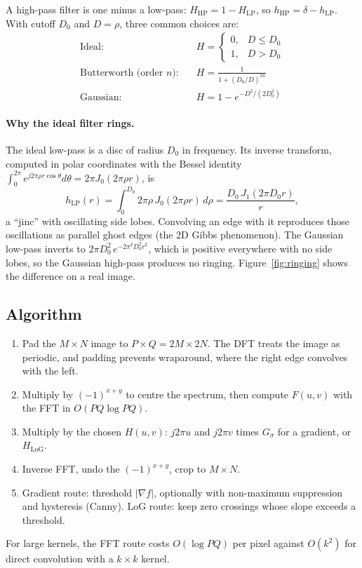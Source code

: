 \documentclass[11pt]{article}
\begin{document}
A high-pass filter is one minus a low-pass: $H_{\text{HP}}=1-H_{\text{LP}}$, so $h_{\text{HP}}=\delta-h_{\text{LP}}$. With cutoff $D_0$ and $D=\rho$, three common choices are:
\begin{align*}
\text{Ideal:}&\quad H=\begin{cases}0,& D\le D_0\\ 1,& D>D_0\end{cases}\\
\text{Butterworth (order $n$):}&\quad H=\frac{1}{1+(D_0/D)^{2n}}\\
\text{Gaussian:}&\quad H=1-e^{-D^2/(2D_0^2)}
\end{align*}
\paragraph{Why the ideal filter rings.} The ideal low-pass is a disc of radius $D_0$ in frequency. Its inverse transform, computed in polar coordinates with the Bessel identity $\int_0^{2\pi}e^{j2\pi\rho r\cos\theta}d\theta=2\pi J_0(2\pi\rho r)$, is
\begin{equation}
h_{\text{LP}}(r)=\int_0^{D_0}2\pi\rho\,J_0(2\pi\rho r)\,d\rho=\frac{D_0\,J_1(2\pi D_0 r)}{r},
\end{equation}
a ``jinc'' with oscillating side lobes. Convolving an edge with it reproduces those oscillations as parallel ghost edges (the 2D Gibbs phenomenon). The Gaussian low-pass inverts to $2\pi D_0^2\,e^{-2\pi^2D_0^2r^2}$, which is positive everywhere with no side lobes, so the Gaussian high-pass produces no ringing. Figure~\ref{fig:ringing} shows the difference on a real image.

\subsection{Algorithm}
\begin{enumerate}[leftmargin=*,itemsep=2pt]
\item Pad the $M\times N$ image to $P\times Q=2M\times2N$. The DFT treats the image as periodic, and padding prevents wraparound, where the right edge convolves with the left.
\item Multiply by $(-1)^{x+y}$ to centre the spectrum, then compute $F(u,v)$ with the FFT in $O(PQ\log PQ)$.
\item Multiply by the chosen $H(u,v)$: $j2\pi u$ and $j2\pi v$ times $G_\sigma$ for a gradient, or $H_{\text{LoG}}$.
\item Inverse FFT, undo the $(-1)^{x+y}$, crop to $M\times N$.
\item Gradient route: threshold $|\nabla f|$, optionally with non-maximum suppression and hysteresis (Canny). LoG route: keep zero crossings whose slope exceeds a threshold.
\end{enumerate}
For large kernels, the FFT route costs $O(\log PQ)$ per pixel against $O(k^2)$ for direct convolution with a $k\times k$ kernel.
\end{document}
